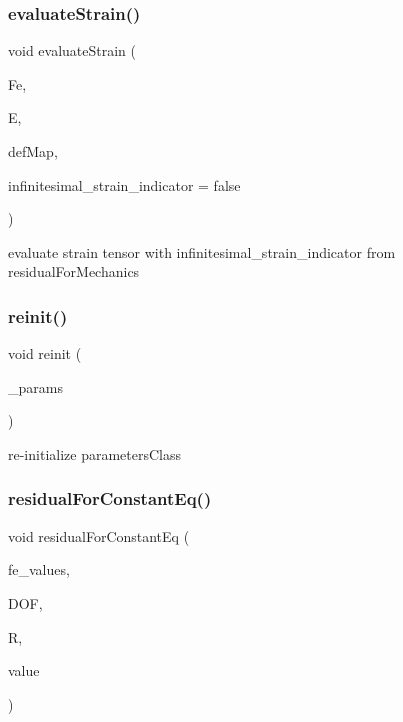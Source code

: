 \subsubsection{\texorpdfstring{evaluate\+Strain()}{evaluateStrain()}}
{\footnotesize\ttfamily void evaluate\+Strain (\begin{DoxyParamCaption}\item[{dealii\+::\+Table$<$ 3, T $>$ \&}]{Fe,  }\item[{dealii\+::\+Table$<$ 3, T $>$ \&}]{E,  }\item[{\mbox{\hyperlink{structdeformation_map}{deformation\+Map}}$<$ T, dim $>$ \&}]{def\+Map,  }\item[{bool}]{infinitesimal\+\_\+strain\+\_\+indicator = {\ttfamily false} }\end{DoxyParamCaption})}

evaluate strain tensor with infinitesimal\+\_\+strain\+\_\+indicator from residual\+For\+Mechanics \mbox{\label{class_residual_a683e96e9d88d46820c0964786424fdf2}} 
\subsubsection{\texorpdfstring{reinit()}{reinit()}}
{\footnotesize\ttfamily void reinit (\begin{DoxyParamCaption}\item[{dealii\+::\+Parameter\+Handler \&}]{\+\_\+params }\end{DoxyParamCaption})}

re-\/initialize parameters\+Class \mbox{\label{class_residual_ab1fcf2c2ae911f4d0c73e59e60f1e6ad}} 
\subsubsection{\texorpdfstring{residual\+For\+Constant\+Eq()}{residualForConstantEq()}\hspace{0.1cm}{\footnotesize\ttfamily [1/2]}}
{\footnotesize\ttfamily void residual\+For\+Constant\+Eq (\begin{DoxyParamCaption}\item[{const F\+E\+Values$<$ dim $>$ \&}]{fe\+\_\+values,  }\item[{unsigned int}]{D\+OF,  }\item[{dealii\+::\+Table$<$ 1, T $>$ \&}]{R,  }\item[{dealii\+::\+Table$<$ 1, T $>$ \&}]{value }\end{DoxyParamCaption})}

